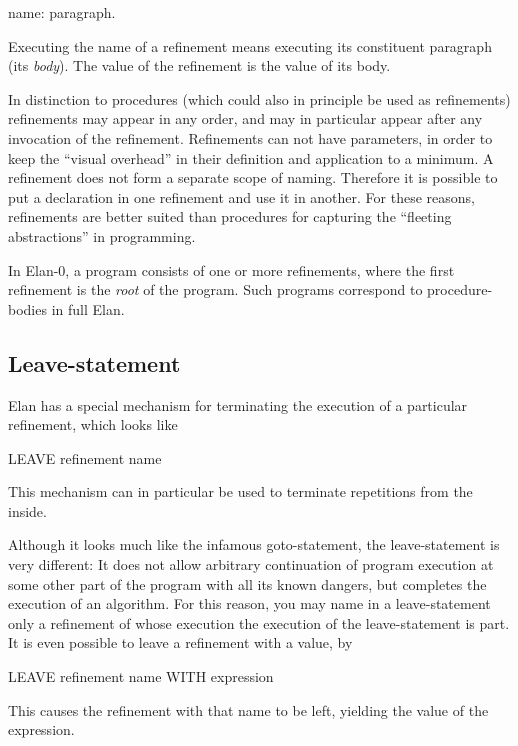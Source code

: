 \begin{elan}
        name: paragraph.
\end{elan}

\noindent
Executing the name of a refinement means executing its constituent
paragraph (its {\em body}). The value of the refinement is the
value of its body.

In distinction to procedures (which could also in principle be
used as refinements) refinements may appear in any order, and
may in particular appear after any invocation of the refinement.
Refinements can not have parameters, in order to keep the ``visual
overhead'' in their definition and application to a minimum.
A refinement does not form a separate scope of naming. Therefore
it is possible to put a declaration in one refinement and use
it in another. For these reasons, refinements are better suited
than procedures for capturing the ``fleeting abstractions'' in
programming.

In Elan-0, a program consists of one or more refinements, where
the first refinement is the {\em root} of the program. Such programs
correspond to procedure-bodies in full Elan.

\subsection{Leave-statement}

Elan has a special mechanism for terminating the execution of
a particular refinement, which looks like

\begin{elan}
        LEAVE refinement name
\end{elan}

\noindent
This mechanism can in particular be used to terminate repetitions
from the inside.

Although it looks much like the infamous goto-statement, the
leave-statement is very different: It does not allow arbitrary
continuation of program execution at some other part of the program
with all its known dangers, but completes the execution of an
algorithm. For this reason, you may name in a leave-statement
only a refinement of whose execution the execution of the leave-statement
is part.
It is even possible to leave a refinement with a value, by

\begin{elan}
        LEAVE refinement name WITH expression
\end{elan}

\noindent
This causes the refinement with that name to be left, yielding
the value of the expression.

